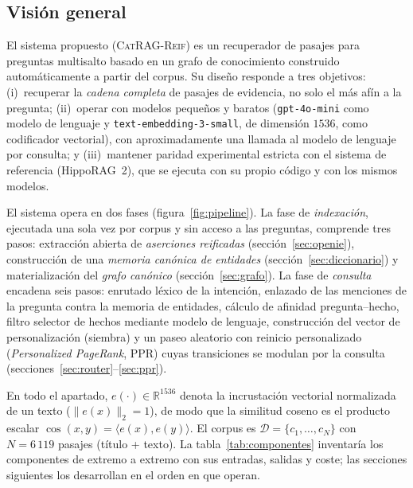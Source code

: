 \documentclass[11pt,a4paper]{article}
\newcommand{\sys}{\textsc{CatRAG-Reif}}          %
\newcommand{\hippo}{HippoRAG~2}
\newcommand{\R}{\mathbb{R}}
\newcommand{\norm}[1]{\lVert #1 \rVert}
\begin{document}
\subsection{Visión general}
\label{sec:vision}

El sistema propuesto (\sys) es un recuperador de pasajes para preguntas
multisalto basado en un grafo de conocimiento construido automáticamente a
partir del corpus. Su diseño responde a tres objetivos: (i)~recuperar la
\emph{cadena completa} de pasajes de evidencia, no solo el más afín a la
pregunta; (ii)~operar con modelos pequeños y baratos
(\texttt{gpt-4o-mini} como modelo de lenguaje y
\texttt{text-embedding-3-small}, de dimensión $1536$, como codificador
vectorial), con aproximadamente una llamada al modelo de lenguaje por
consulta; y (iii)~mantener paridad experimental estricta con el sistema de
referencia (\hippo{}), que se ejecuta con su propio código y con los mismos
modelos.

El sistema opera en dos fases (figura~\ref{fig:pipeline}). La fase de
\emph{indexación}, ejecutada una sola vez por corpus y sin acceso a las
preguntas, comprende tres pasos: extracción abierta de \emph{aserciones
reificadas} (sección~\ref{sec:openie}), construcción de una \emph{memoria
canónica de entidades} (sección~\ref{sec:diccionario}) y materialización del
\emph{grafo canónico} (sección~\ref{sec:grafo}). La fase de \emph{consulta}
encadena seis pasos: enrutado léxico de la intención, enlazado de las
menciones de la pregunta contra la memoria de entidades, cálculo de afinidad
pregunta--hecho, filtro selector de hechos mediante modelo de lenguaje,
construcción del vector de personalización (siembra) y un paseo aleatorio con
reinicio personalizado (\emph{Personalized PageRank}, PPR) cuyas transiciones
se modulan por la consulta (secciones~\ref{sec:router}--\ref{sec:ppr}).

En todo el apartado, $e(\cdot)\in\R^{1536}$ denota la incrustación vectorial
normalizada de un texto ($\norm{e(x)}_2=1$), de modo que la similitud coseno
es el producto escalar $\cos(x,y)=\langle e(x),e(y)\rangle$. El corpus es
$\mathcal{D}=\{c_1,\dots,c_N\}$ con $N=6\,119$ pasajes (título + texto).
La tabla~\ref{tab:componentes} inventaría los componentes de extremo a
extremo con sus entradas, salidas y coste; las secciones siguientes los
desarrollan en el orden en que operan.
\end{document}
